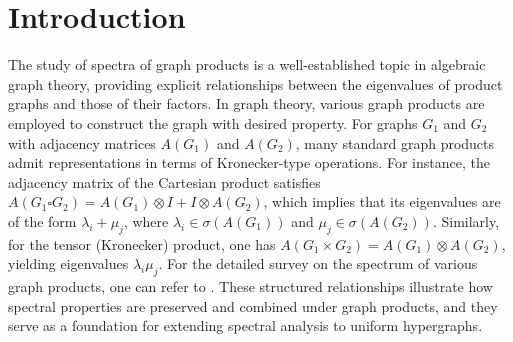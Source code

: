 \documentclass[10pt,a4paper]{article}
\begin{document}
	\begin{abstract}
		\noindent
		
		Spectral hypergraph theory has recently attracted considerable interest as it provides a natural framework for modeling higher-order relationships beyond classical graphs. In this setting, eigenvalues of adjacency, Laplacian, and signless-Laplacian hypermatrices play an important role in understanding the underlying structure of hypergraphs. In this work, we study the adjacency, Laplacian, and signless-Laplacian eigenvalues of the join, Kronecker, and corona products of hypergraphs, and examine how these spectra behave under such operations. These investigations help in better understanding the interplay between hypergraph structure and spectral properties. The reciprocal eigenvalue property is of particular interest due to the spectral symmetries it reflects. Motivated by this, we extend the notion of reciprocal eigenvalue property to hypergraphs and show that power hypertrees do not satisfy this property.
		\\[2mm]
		{\bf Keywords:} join; corona; Kronecker; main eigenvalue; reciprocal eigenvalue.\\[2mm]
		{\bf 2020 Mathematics Subject Classification:} 05C65, 15A69, 15A18.
	\end{abstract}
	
	\baselineskip=0.20in
	
	
	
	\section{Introduction}
	The study of spectra of graph products is a well-established topic in algebraic graph theory, providing explicit relationships between the eigenvalues of product graphs and those of their factors. In graph theory, various graph products are employed to construct the graph with desired property.
	For graphs $G_1$ and $G_2$ with adjacency matrices $A(G_1)$ and $A(G_2)$, many standard graph products admit representations in terms of Kronecker-type operations. For instance, the adjacency matrix of the Cartesian product satisfies $A(G_1 \square G_2) = A(G_1)\otimes I + I \otimes A(G_2)$, which implies that its eigenvalues are of the form $\lambda_i + \mu_j$, where $\lambda_i \in \sigma(A(G_1))$ and $\mu_j \in \sigma(A(G_2))$. Similarly, for the tensor (Kronecker) product, one has $A(G_1 \times G_2) = A(G_1)\otimes A(G_2)$, yielding eigenvalues $\lambda_i \mu_j$.
	For the detailed survey on the spectrum of various graph products, one can refer to \cite{barik2018spectra}.
	These structured relationships illustrate how spectral properties are preserved and combined under graph products, and they serve as a foundation for extending spectral analysis to uniform hypergraphs. 
	
\end{document}
